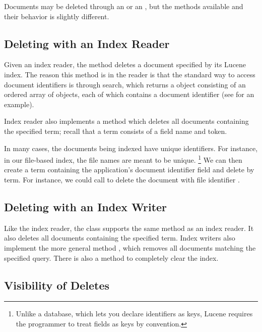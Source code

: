Documents may be deleted through an  or an
, but the methods available and their behavior is
slightly different.

\subsection{Deleting with an Index Reader}

Given an index reader, the method  deletes a
document specified by its Lucene index.  The reason this method is in
the reader is that the standard way to access document identifiers is
through search, which returns a  object consisting of an
ordered array of  objects, each of which contains a
document identifier (see  for an example).

Index reader also implements a method 
which deletes all documents containing the specified term; recall
that a term consists of a field name and token. 

In many cases, the documents being indexed have unique identifiers.
For instance, in our file-based index, the file names are meant to
be unique.%
%
\footnote{Unlike a database, which lets you declare identifiers as
keys, Lucene requires the programmer to treat fields as keys by
convention.}
%
We can then create a term containing the application's document
identifier field and delete by term.  For instance, we could call
 to delete the
document with file identifier .

\subsection{Deleting with an Index Writer}

Like the index reader, the  class supports the same
 method as an index reader.  It also
deletes all documents containing the specified term.  Index writers
also implement the more general method , 
which removes all documents matching the specified query.  There
is also a  method to completely clear the index.

\subsection{Visibility of Deletes}

